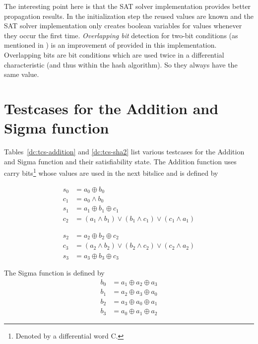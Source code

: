 The interesting point here is that the SAT solver implementation provides better propagation results. In the initialization step the reused values are known and the SAT solver implementation only creates boolean variables for values whenever they occur the first time. \emph{Overlapping bit} detection for two-bit conditions (as mentioned in \cite[296]{Cry07}) is an improvement of \nltool{} provided in this implementation. Overlapping bits are bit conditions which are used twice in a differential characteristic (and thus within the hash algorithm). So they always have the same value.

\section{Testcases for the Addition and Sigma function}
\label{sec:add-sigma-testcases}
%
Tables~\ref{dc:tcs-addition} and \ref{dc:tcs-sha2} list various testcases for the Addition and Sigma function and their satisfiability state. The Addition function uses carry bits\footnote{Denoted by a differential word C.} whose values are used in the next bitslice and is defined by

\begin{minipage}{0.48\textwidth}
  \begin{align*}
    s_0 &= a_0 \oplus b_0 \\
    c_1 &= a_0 \land b_0 \\
    s_1 &= a_1 \oplus b_1 \oplus c_1 \\
    c_2 &= (a_1 \land b_1) \lor (b_1 \land c_1) \lor (c_1 \land a_1)
  \end{align*}
\end{minipage}
\begin{minipage}{0.48\textwidth}
  \begin{align*}
    s_2 &= a_2 \oplus b_2 \oplus c_2 \\
    c_3 &= (a_2 \land b_2) \lor (b_2 \land c_2) \lor (c_2 \land a_2) \\
    s_3 &= a_3 \oplus b_3 \oplus c_3
  \end{align*}
\end{minipage}

The Sigma function is defined by
\begin{align*}
    b_0 &= a_1 \oplus a_2 \oplus a_3 \\
    b_1 &= a_2 \oplus a_3 \oplus a_0 \\
    b_2 &= a_3 \oplus a_0 \oplus a_1 \\
    b_3 &= a_0 \oplus a_1 \oplus a_2
\end{align*}

